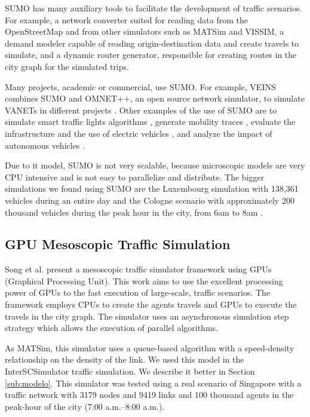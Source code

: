 SUMO has many auxiliary tools to facilitate the development of traffic scenarios. For example, a network converter suited for reading data from the OpenStreetMap and from other simulators such as MATSim and VISSIM, a demand modeler capable of reading origin-destination data and create travels to simulate, and a dynamic router generator, responsible for creating routes in the city graph for the simulated trips. 

Many projects, academic or commercial, use SUMO. For example, VEINS  \cite{riebl2015artery} combines SUMO and OMNET++, an open source network simulator, to simulate VANETs in different projects \cite{buse2018bridging,aslam2018flexible}. Other examples of the use of SUMO are to simulate smart traffic lights algorithms \cite{azevedo2016jade}, generate mobility traces \cite{codeca2017luxembourg,uppoor2014generation}, evaluate the infrastructure and the use of electric vehicles \cite{sagaama2018proposal}, and analyze the impact of autonomous vehicles \cite{tettamanti2018vehicle,garzon2018hybrid}.

Due to it model, SUMO is not very scalable, because microscopic models are very CPU intensive and is not easy to parallelize and distribute. The bigger simulations we found using SUMO are the Luxembourg simulation with 138,361 vehicles during an entire day \cite{codeca2017luxembourg} and the Cologne  scenario with approximately 200 thousand vehicles during the peak hour in the city, from 6am to 8am \cite{uppoor2014generation}.

\subsection{GPU Mesoscopic Traffic Simulation}

Song et al. \cite{song2017gpusimulation} present a mesoscopic traffic simulator framework using GPUs (Graphical Processing Unit). This work aims to use the excellent processing power of GPUs to the fast execution of large-scale, traffic scenarios. The framework employs CPUs to create the agents travels and GPUs to execute the travels in the city graph. The simulator uses an asynchronous simulation step strategy which allows the execution of parallel algorithms.

As MATSim, this simulator uses a queue-based algorithm with a speed-density relationship on the density of the link. We used this model in the InterSCSimulator traffic simulation. We describe it better in Section \ref{sub:modelo}. This simulator was tested using a real scenario of Singapore with a traffic network with 3179 nodes and 9419 links and 100 thousand agents in the peak-hour of the city (7:00 a.m.–8:00 a.m.).

